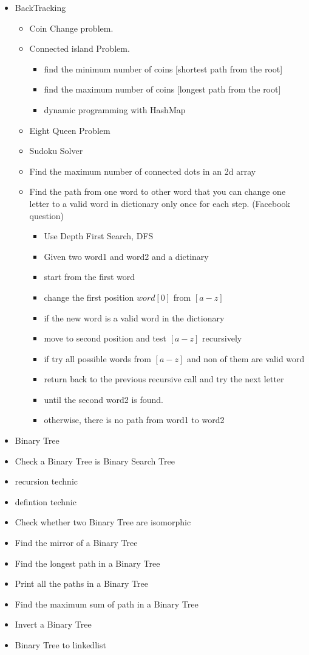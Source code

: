 \documentclass{article}
\begin{document}
\begin{enumerate}
\begin{itemize}
\item BackTracking
    \begin{itemize}
     \item Coin Change problem.
     \item Connected island Problem.
     \begin{itemize}
      \item find the minimum number of coins [shortest path from the root]
      \item find the maximum number of coins [longest path from the root]
      \item dynamic programming with HashMap 
     \end{itemize}
     \item Eight Queen Problem
     \item Sudoku Solver
     \item Find the maximum number of connected dots in an 2d array 
     \item Find the path from one word to other word that you can change one letter to a valid word in dictionary only once for each step.
     (Facebook question) 
     \begin{itemize}
      \item Use Depth First Search, DFS
      \item Given two word1 and word2 and a dictinary
      \item start from the first word
      \item change the first position $word[0]$ from $[a-z]$
      \item if the new word is a valid word in the dictionary
      \item move to second position and test $[a-z]$ recursively
      \item if try all possible words from $[a-z]$ and non of them are valid word
      \item return back to the previous recursive call and try the next letter
      \item until the second word2 is found.
      \item otherwise, there is no path from word1 to word2
     \end{itemize}
    
    \end{itemize}

\item Binary Tree
\item Check a Binary Tree is Binary Search Tree 
\item recursion technic
\item defintion technic 
\item Check whether two Binary Tree are isomorphic
\item Find the mirror of a Binary Tree
\item Find the longest path in a Binary Tree
\item Print all the paths in a Binary Tree
\item Find the maximum sum of path in a Binary Tree
\item Invert a Binary Tree
\item Binary Tree to linkedlist


\end{itemize}
\end{enumerate}
\end{document}
